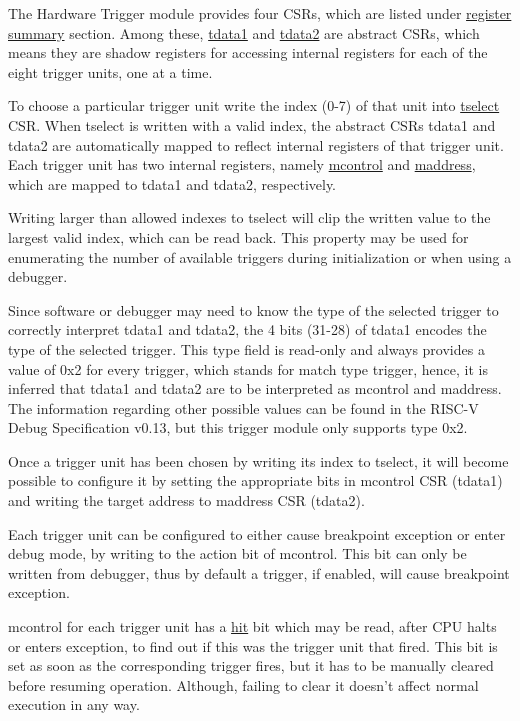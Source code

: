 \documentclass[main\_\_EN.tex]{subfiles}
\begin{document}
The Hardware Trigger module provides four CSRs, which are listed under \hyperref[sec:riscvcpu-hwt-reg-summ]{register summary} section. Among these, \hyperref[regdesc:TDATA1]{tdata1} and \hyperref[regdesc:TDATA2]{tdata2} are abstract CSRs, which means they are shadow registers for accessing internal registers for each of the eight trigger units, one at a time.

To choose a particular trigger unit write the index (0-7) of that unit into \hyperref[regdesc:TSELECT]{tselect} CSR. When tselect is written with a valid index, the abstract CSRs tdata1 and tdata2 are automatically mapped to reflect internal registers of that trigger unit. Each trigger unit has two internal registers, namely \hyperref[regdesc:MCONTROL]{mcontrol} and \hyperref[regdesc:MADDRESS]{maddress}, which are mapped to tdata1 and tdata2, respectively.

Writing larger than allowed indexes to tselect will clip the written value to the largest valid index, which can be read back. This property may be used for enumerating the number of available triggers during initialization or when using a debugger.

Since software or debugger may need to know the type of the selected trigger to correctly interpret tdata1 and tdata2, the 4 bits
(31-28) of tdata1 encodes the type of the selected trigger. This type field is read-only and always provides a value of 0x2 for every trigger, which stands for match type trigger, hence, it is inferred that tdata1 and tdata2 are to be interpreted as mcontrol and maddress. The information regarding other possible values can be found in the RISC-V Debug Specification v0.13, but this trigger module only supports type 0x2.

Once a trigger unit has been chosen by writing its index to tselect, it will become possible to configure it by setting the appropriate bits in mcontrol CSR (tdata1) and writing the target address to maddress CSR (tdata2).

Each trigger unit can be configured to either cause breakpoint exception or enter debug mode, by writing to the action bit of mcontrol. This bit can only be written from debugger, thus by default a trigger, if enabled, will cause breakpoint exception.

mcontrol for each trigger unit has a \hyperref[fielddesc:MCONTROLHIT]{hit} bit which may be read, after CPU halts or enters exception, to find out if this was the trigger unit that fired. This bit is set as soon as the corresponding trigger fires, but it has to be manually cleared before resuming operation. Although, failing to clear it doesn't affect normal execution in any way.
\end{document}
